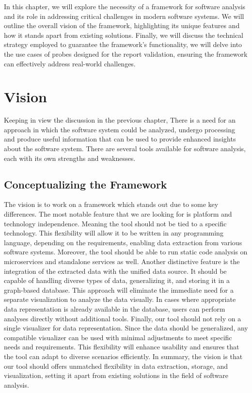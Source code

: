 In this chapter, we will explore the necessity of a framework for software analysis and its role in addressing critical challenges in modern software systems. We will outline the overall vision of the framework, highlighting its unique features and how it stands apart from existing solutions. Finally, we will discuss the technical strategy employed to guarantee the framework's functionality, we will delve into the use cases of probes designed for the report validation, ensuring the framework can effectively address real-world challenges.

\section{Vision}\label{sec:vision}

Keeping in view the discussion in the previous chapter, There is a need for an approach in which the software system could be analyzed, undergo processing and produce useful information that can be used to provide enhanced insights about the software system. There are several tools available for software analysis, each with its own strengths and weaknesses. 

\subsection{Conceptualizing the Framework}
The vision is to work on a framework which stands out due to some key differences. The most notable feature that we are looking for is platform and technology independence. Meaning the tool should not be tied to a specific technology. This flexibility will allow it to be written in any programming language, depending on the requirements, enabling data extraction from various software systems. Moreover, the tool should be able to run static code analysis on microservices and standalone services as well. Another distinctive feature is the integration of the extracted data with the unified data source. It should be capable of handling diverse types of data, generalizing it, and storing it in a graph-based database. This approach will eliminate the immediate need for a separate visualization to analyze the data visually. In cases where appropriate data representation is already available in the database, users can perform analyses directly without additional tools. Finally, our tool should not rely on a single visualizer for data representation. Since the data should be generalized, any compatible visualizer can be used with minimal adjustments to meet specific needs and requirements. This flexibility will enhance usability and ensures that the tool can adapt to diverse scenarios efficiently. In summary, the vision is that our tool should offers unmatched flexibility in data extraction, storage, and visualization, setting it apart from existing solutions in the field of software analysis.

